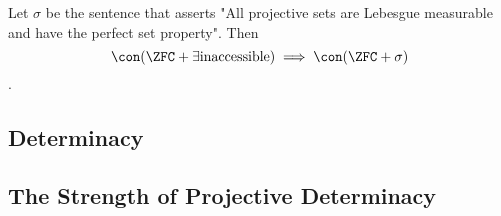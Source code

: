 \documentclass{beamer}
\begin{document}
\begin{frame}
\begin{theorem}
Let $\sigma$ be the sentence that asserts "All projective sets are Lebesgue
measurable and have the perfect set property". Then
$$\con(\ZFC + \exists \text{inaccessible}) \implies \con(\ZFC + \sigma)$$.
\end{theorem}
\end{frame}

\subsection{Determinacy}

\subsection{The Strength of Projective Determinacy}
\end{document}
